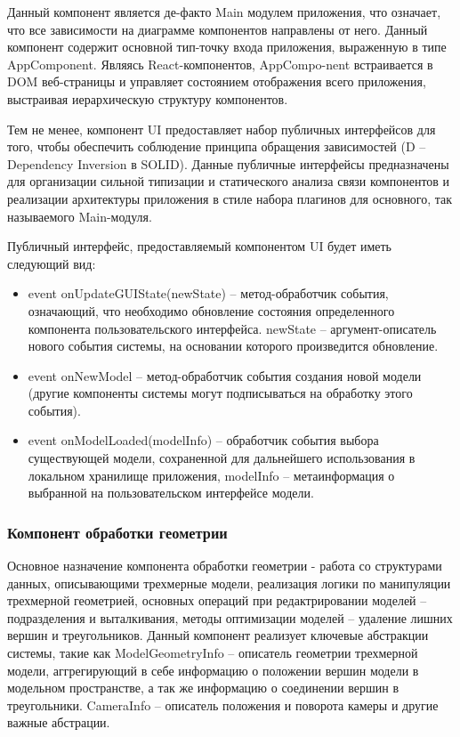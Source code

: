 Данный компонент является де-факто Main модулем приложения, что означает, что все зависимости на диаграмме компонентов направлены от него. Данный компонент содержит основной тип-точку входа
приложения, выраженную в типе AppComponent. Являясь React-компонентов, AppCompo-nent встраивается в DOM веб-страницы и управляет состоянием отображения всего приложения, выстраивая иерархическую структуру
компонентов.

Тем не менее, компонент UI предоставляет набор публичных интерфейсов для того, чтобы обеспечить соблюдение принципа обращения зависимостей (D -- Dependency Inversion в SOLID\cite{solid}).
Данные публичные интерфейсы предназначены для организации сильной типизации и статического анализа связи компонентов и реализации архитектуры приложения в стиле набора плагинов для основного,
так называемого Main-модуля.

Публичный интерфейс, предоставляемый компонентом UI будет иметь следующий вид:
\begin{itemize}
\item event onUpdateGUIState(newState) -- метод-обработчик события, означающий, что необходимо обновление состояния определенного компонента пользовательского
интерфейса. newState -- аргумент-описатель нового события системы, на основании которого произведится обновление.
\item event onNewModel -- метод-обработчик события создания новой модели (другие компоненты системы могут подписываться на обработку этого события).
\item event onModelLoaded(modelInfo) -- обработчик события выбора существующей модели, сохраненной для дальнейшего использования в локальном хранилище приложения, modelInfo --
метаинформация о выбранной на пользовательском интерфейсе модели.
\end{itemize}


\subsubsection{Компонент обработки геометрии}
\label{sub:theory:components:geometry}

Основное назначение компонента обработки геометрии - работа со структурами данных, описывающими трехмерные модели, реализация логики по манипуляции трехмерной геометрией,
основных операций при редактрировании моделей -- подразделения и выталкивания, методы оптимизации моделей -- удаление лишних вершин и треугольников.
Данный компонент реализует ключевые абстракции системы, такие как ModelGeometryInfo -- описатель геометрии трехмерной модели, аггрегирующий в себе информацию о положении вершин модели
в модельном пространстве, а так же информацию о соединении вершин в треугольники. CameraInfo -- описатель положения и поворота камеры и другие важные абстрации.

